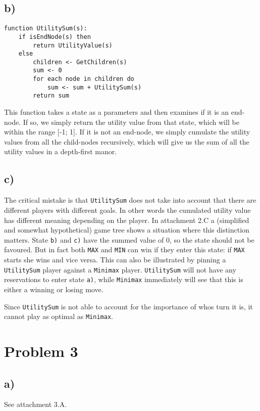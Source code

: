 \documentclass[12pt,a4paper]{article}
\begin{document}
\subsection*{b)}
\begin{lstlisting}[frame=single]
function UtilitySum(s):
    if isEndNode(s) then
        return UtilityValue(s)
    else
        children <- GetChildren(s)
        sum <- 0
        for each node in children do
            sum <- sum + UtilitySum(s)
        return sum
\end{lstlisting}
This function takes a state as a parameters and then examines if it is an
end-node. If so, we simply return the utility value from that state, which
will be within the range [-1; 1].
If it is not an end-node, we simply cumulate the utility values from
all the child-nodes recursively, which will give us the sum of all the
utility values in a depth-first manor.

\subsection*{c)}
The critical mistake is that \texttt{UtilitySum} does not take into
account that there are different players with different goals. In
other words the cumulated utility value has different meaning depending
on the player. In attachment 2.C a (simplified and somewhat hypothetical)
game tree shows a
situation where this distinction matters. State \texttt{b)} and \texttt{c)}
have the summed value of 0, so the state should not be favoured. But in fact
both \texttt{MAX} and \texttt{MIN} can win if they enter this state: if
\texttt{MAX} starts she wins and vice versa. This can also be illustrated
by pinning a \texttt{UtilitySum} player against a \texttt{Minimax} player.
\texttt{UtilitySum} will not have any reservations to enter state \texttt{a)},
while \texttt{Minimax} immediately will see that this is either a winning
or losing move.

Since \texttt{UtilitySum} is not
able to account for the importance of whos turn it is, it cannot play as
optimal as \texttt{Minimax}.

\pagebreak
\section*{Problem 3}
\subsection*{a)}
See attachment 3.A.
\end{document}
